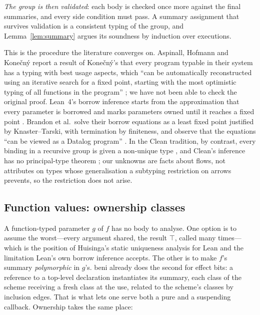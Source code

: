 \emph{The group is then validated}: each body is checked once more against the final summaries, and
every side condition must pass. A summary assignment that survives validation is a consistent typing
of the group, and Lemma~\ref{lem:summary} argues its soundness by induction over executions.

This is the procedure the literature converges on. Aspinall, Hofmann and Kone\v{c}n\'y report a
result of Kone\v{c}n\'y's that every program typable in their system has a typing with best usage
aspects, which ``can be automatically reconstructed using an iterative search for a fixed point,
starting with the most optimistic typing of all functions in the program''
\citep[\S6.2]{aspinall2008usage}; we have not been able to check the original proof. Lean~4's borrow inference starts from
the approximation that every parameter is borrowed and marks parameters owned until it reaches a
fixed point \citep[\S5.2]{ullrich2019beans}. Brandon et al.\ solve their borrow equations as a least
fixed point justified by Knaster--Tarski, with termination by finiteness, and observe that the
equations ``can be viewed as a Datalog program'' \citep[\S4.4]{brandon2026borrows}. In the Clean
tradition, by contrast, every binding in a recursive group is given a non-unique type
\citep[\S7]{devries2008simplified}, and Clean's inference has no principal-type theorem \citep{barendsen1996uniqueness}; our unknowns are facts
about flows, not attributes on types whose generalisation a subtyping restriction on arrows
prevents, so the restriction does not arise.

\subsection{Function values: ownership classes}
\label{sec:inf-classes}

A function-typed parameter $g$ of $f$ has no body to analyse. One option is to assume the worst---every
argument shared, the result $\top$, called many times---which is the position of Huisinga's static
uniqueness analysis for Lean \citep[\S4.1]{huisinga2023lean} and the limitation Lean's own borrow
inference accepts. The other is to make $f$'s summary \emph{polymorphic} in $g$'s. beni already does
the second for effect bits: a reference to a top-level declaration instantiates its summary, each
class of the scheme receiving a fresh class at the use, related to the scheme's classes by inclusion
edges. That is what lets one  serve both a pure and a suspending callback. Ownership
takes the same place:

